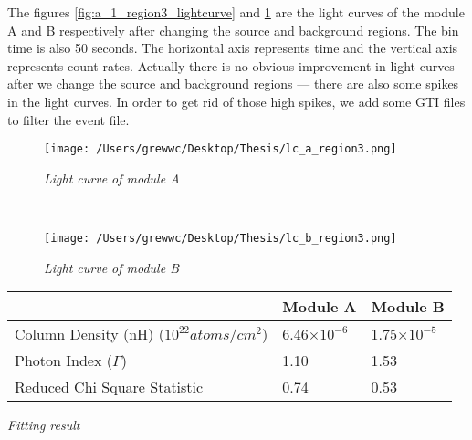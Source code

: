 \documentclass[12pt]{report}
\newcommand{\mycaption}[1]{\caption{\textit{\footnotesize #1}}}
\begin{document}
        \indent The figures \ref{fig:a_1_region3_lightcurve} and \ref{fig:b_1_region3_lightcurve} are the light 
        curves 
        of the module A and B respectively after changing the source and background regions. The bin time is 
        also 50 seconds. The horizontal axis represents time and the vertical axis represents count rates. 
        Actually there is no obvious improvement in light curves after we change the source and background regions
        --- there are also some spikes in the light curves. In order to get rid of those high spikes, we add some 
        GTI files to filter the event file. 
        \begin{figure}[!ht]  
          \begin{minipage}{1\textwidth}
            \begin{center} 
                \texttt{[image: /Users/grewwc/Desktop/Thesis/lc\_a\_region3.png]}
                \mycaption{Light curve of module A}
                \label{fig:a_1_region3_lightcurve}
            \end{center}
            \end{minipage}
            \\
          \begin{minipage}{1\textwidth}
            \begin{center}
            \texttt{[image: /Users/grewwc/Desktop/Thesis/lc\_b\_region3.png]}
            \mycaption{Light curve of module B}
            \label{fig:b_1_region3_lightcurve}
            \end{center}
          \end{minipage}
          \centering
        \end{figure}
        \begin{table}[!h]   
          \centering
          \begin{tabular}{| m{4cm} | m{3cm} | m{3cm} |}
            \hline
            & Module A & Module B \\
            \hline
            Column Density (nH) ($10^{22} atoms/cm^2$) & 6.46$\times10^{-6}$ & 1.75$\times10^{-5}$\\ 
            \hline
            Photon Index ($\Gamma$) & 1.10 & 1.53 \\
            \hline 
            Reduced Chi Square Statistic & 0.74 & 0.53 \\
            \hline 
          \end{tabular}
          \mycaption{Fitting result}
          \label{table:parameter_region3}
        \end{table}
        
\end{document}
